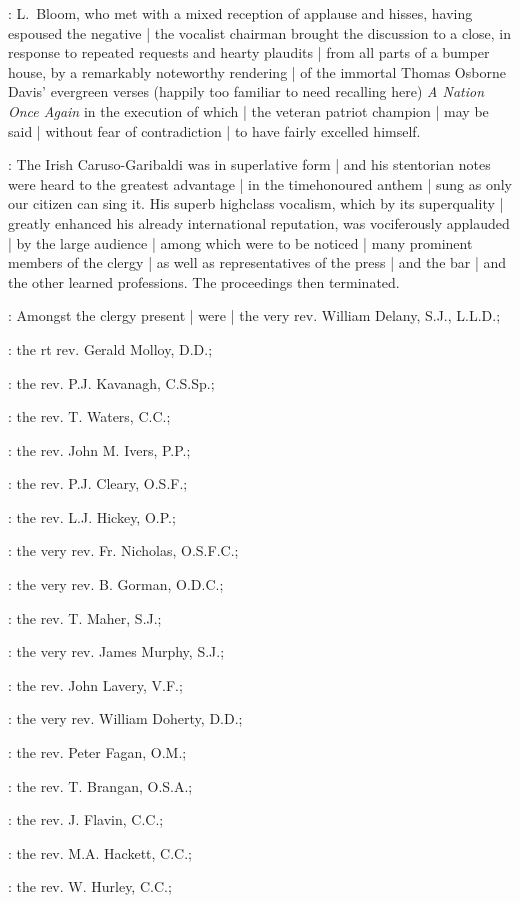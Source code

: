 :
L.~Bloom,
who met with a mixed reception of applause and hisses,
having espoused the negative |
the vocalist chairman brought the discussion to a close,
in response to repeated requests and hearty plaudits |
from all parts of a bumper house,
by a remarkably noteworthy rendering |
of the immortal Thomas Osborne Davis' evergreen verses
(happily too familiar to need recalling here)
\emph{A Nation Once Again}
in the execution of which |
the veteran patriot champion |
may be said |
without fear of contradiction |
to have fairly excelled himself.

:
The Irish Caruso-Garibaldi was in superlative form |
and his stentorian notes were heard to the greatest advantage |
in the timehonoured anthem |
sung as only our citizen can sing it.
His superb highclass vocalism,
which by its superquality |
greatly enhanced his already international reputation,
was vociferously applauded |
by the large audience |
among which were to be noticed |
many prominent members of the clergy |
as well as representatives of the press |
and the bar |
and the other learned professions.
The proceedings then terminated.

:
Amongst the clergy present |
were |
the very rev. William Delany, S.J., L.L.D.;

:
the rt rev. Gerald Molloy, D.D.;

:
the rev. P.J. Kavanagh, C.S.Sp.;

:
the rev. T. Waters, C.C.;

:
the rev. John M. Ivers, P.P.;

:
the rev. P.J. Cleary, O.S.F.;

:
the rev. L.J. Hickey, O.P.;

:
the very rev. Fr. Nicholas, O.S.F.C.;

:
the very rev. B. Gorman, O.D.C.;

:
the rev. T. Maher, S.J.;

:
the very rev. James Murphy, S.J.;

:
the rev. John Lavery, V.F.;

:
the very rev. William Doherty, D.D.;

:
the rev. Peter Fagan, O.M.;

:
the rev. T. Brangan, O.S.A.;

:
the rev. J. Flavin, C.C.;

:
the rev. M.A. Hackett, C.C.;

:
the rev. W. Hurley, C.C.;


